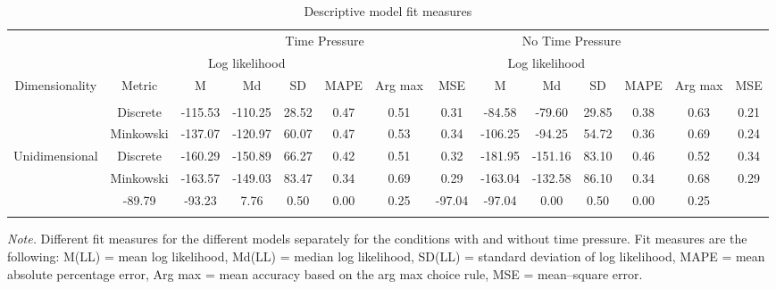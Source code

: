 \documentclass[a4paper,man,natbib]{apa6}
\begin{document}
\begin{sidewaystable}
\begin{center}
\begin{threeparttable}
\caption{Descriptive model fit measures}
\begin{tabular}{cccccccccccccc}
\toprule
 &  & \multicolumn{6}{c}{Time Pressure} & \multicolumn{4}{c}{No Time Pressure}\\
\cmidrule(r){3-8} \cmidrule(r){9-14}
 &  & \multicolumn{3}{c}{Log likelihood} & & & & \multicolumn{3}{c}{Log likelihood} & & & \\
\cmidrule(r){3-5} \cmidrule(r){9-11}
Dimensionality & \multicolumn{1}{c}{Metric} & \multicolumn{1}{c}{M} & \multicolumn{1}{c}{Md} & \multicolumn{1}{c}{SD} & \multicolumn{1}{c}{MAPE} & \multicolumn{1}{c}{Arg max} & \multicolumn{1}{c}{MSE} & \multicolumn{1}{c}{M} & \multicolumn{1}{c}{Md} & \multicolumn{1}{c}{SD} & \multicolumn{1}{c}{MAPE} & \multicolumn{1}{c}{Arg max} & \multicolumn{1}{c}{MSE}\\
\midrule
\addlinespace
\multicolumn{2}{c}{\emph{Generalized Context Model}} \\
\addlinespace
\multirow{2}{*}{Multidimensional} & Discrete & -115.53 & -110.25 & 28.52 & 0.47 & 0.51 & 0.31 & -84.58 & -79.60 & 29.85 & 0.38 & 0.63 & 0.21\\
 & Minkowski & -137.07 & -120.97 & 60.07 & 0.47 & 0.53 & 0.34 & -106.25 & -94.25 & 54.72 & 0.36 & 0.69 & 0.24\\
\multirow{2}{*}{Unidimensional} & Discrete & -160.29 & -150.89 & 66.27 & 0.42 & 0.51 & 0.32 & -181.95 & -151.16 & 83.10 & 0.46 & 0.52 & 0.34\\
 & Minkowski & -163.57 & -149.03 & 83.47 & 0.34 & 0.69 & 0.29 & -163.04 & -132.58 & 86.10 & 0.34 & 0.68 & 0.29\\
\addlinespace
\multicolumn{2}{c}{\emph{Random--Choice Model}} & -89.79 & -93.23 & 7.76 & 0.50 & 0.00 & 0.25 & -97.04 & -97.04 & 0.00 & 0.50 & 0.00 & 0.25\\
\bottomrule
\addlinespace
\end{tabular}
\begin{tablenotes}[para]
\textit{Note.} Different fit measures for the different models separately for the conditions with and without time pressure. 
          Fit measures are the following: M(LL) = mean log likelihood, Md(LL) = median log likelihood, SD(LL) = standard deviation of log likelihood, MAPE = mean absolute percentage error, Arg max = mean accuracy based on the arg max choice rule, MSE = mean--square error.
\end{tablenotes}
\end{threeparttable}
\end{center}
\end{sidewaystable}
\end{document}
